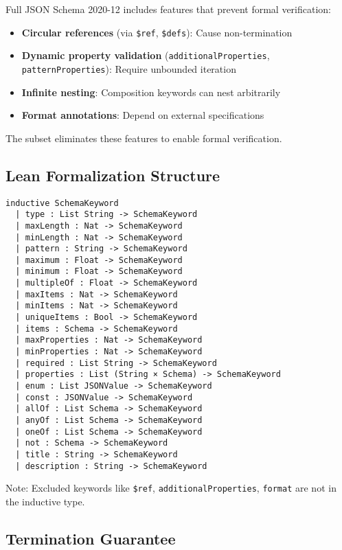 Full JSON Schema 2020-12 includes features that prevent formal verification:

\begin{itemize}
  \item \textbf{Circular references} (via \texttt{\$ref}, \texttt{\$defs}): Cause non-termination
  \item \textbf{Dynamic property validation} (\texttt{additionalProperties}, \texttt{patternProperties}): Require unbounded iteration
  \item \textbf{Infinite nesting}: Composition keywords can nest arbitrarily
  \item \textbf{Format annotations}: Depend on external specifications
\end{itemize}

The subset eliminates these features to enable formal verification.

\subsection{Lean Formalization Structure}

\begin{verbatim}
inductive SchemaKeyword
  | type : List String -> SchemaKeyword
  | maxLength : Nat -> SchemaKeyword
  | minLength : Nat -> SchemaKeyword
  | pattern : String -> SchemaKeyword
  | maximum : Float -> SchemaKeyword
  | minimum : Float -> SchemaKeyword
  | multipleOf : Float -> SchemaKeyword
  | maxItems : Nat -> SchemaKeyword
  | minItems : Nat -> SchemaKeyword
  | uniqueItems : Bool -> SchemaKeyword
  | items : Schema -> SchemaKeyword
  | maxProperties : Nat -> SchemaKeyword
  | minProperties : Nat -> SchemaKeyword
  | required : List String -> SchemaKeyword
  | properties : List (String × Schema) -> SchemaKeyword
  | enum : List JSONValue -> SchemaKeyword
  | const : JSONValue -> SchemaKeyword
  | allOf : List Schema -> SchemaKeyword
  | anyOf : List Schema -> SchemaKeyword
  | oneOf : List Schema -> SchemaKeyword
  | not : Schema -> SchemaKeyword
  | title : String -> SchemaKeyword
  | description : String -> SchemaKeyword
\end{verbatim}

Note: Excluded keywords like \texttt{\$ref}, \texttt{additionalProperties}, \texttt{format} are not in the inductive type.

\subsection{Termination Guarantee}


